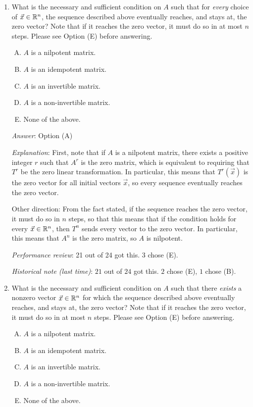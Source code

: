 \documentclass[10pt]{amsart}
\begin{document}
\begin{enumerate}
\item What is the necessary and sufficient condition on $A$ such that
  for {\em every} choice of $\vec{x} \in \mathbb{R}^n$, the sequence described
  above eventually reaches, and stays at, the zero vector? Note that
  if it reaches the zero vector, it must do so in at most $n$
  steps. Please see Option (E) before answering.

  \begin{enumerate}[(A)]
  \item $A$ is a nilpotent matrix.
  \item $A$ is an idempotent matrix.
  \item $A$ is an invertible matrix.
  \item $A$ is a non-invertible matrix.
  \item None of the above.
  \end{enumerate}

  {\em Answer}: Option (A)

  {\em Explanation}: First, note that if $A$ is a nilpotent matrix,
  there exists a positive integer $r$ such that $A^r$ is the zero
  matrix, which is equivalent to requiring that $T^r$ be the zero
  linear transformation. In particular, this means that $T^r(\vec{x})$
  is the zero vector for all initial vectors $\vec{x}$, so every
  sequence eventually reaches the zero vector.

  Other direction: From the fact stated, if the sequence reaches the
  zero vector, it must do so in $n$ steps, so that this means that if
  the condition holds for every $\vec{x} \in \mathbb{R}^n$, then $T^n$ sends
  every vector to the zero vector. In particular, this means that
  $A^n$ is the zero matrix, so $A$ is nilpotent.

  {\em Performance review}: 21 out of 24 got this. 3 chose (E).

  {\em Historical note (last time)}: $21$ out of $24$ got this. $2$ chose (E),
  $1$ chose (B).

\item What is the necessary and sufficient condition on $A$ such that
  there {\em exists} a nonzero vector $\vec{x} \in \mathbb{R}^n$ for which the
  sequence described above eventually reaches, and stays at, the zero
  vector?  Note that if it reaches the zero vector, it must do so in
  at most $n$ steps. Please see Option (E) before answering.

  \begin{enumerate}[(A)]
  \item $A$ is a nilpotent matrix.
  \item $A$ is an idempotent matrix.
  \item $A$ is an invertible matrix.
  \item $A$ is a non-invertible matrix.
  \item None of the above.
  \end{enumerate}


\end{enumerate}
\end{document}
